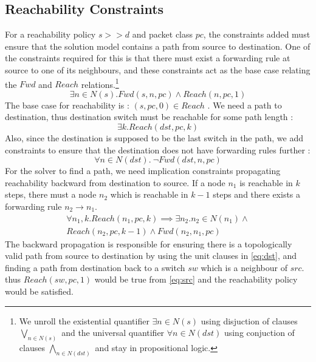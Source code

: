 \subsection{Reachability Constraints} \label{sec:reach}
For a reachability policy $s >> d$ and packet class $pc$, the constraints added must ensure that the solution model contains a path 
from source to destination. 
One of the constraints required for this is that there must exist a forwarding rule at source to one of its neighbours, and 
these constraints
act as the base case relating the $Fwd$ and $Reach$ relations.\footnote{
	We unroll the existential quantifier $\exists n \in N(s)$ using disjuction of 
	clauses $\bigvee\limits_{n \in N(s)}$ and
	the universal quantifier $\forall n \in N(dst)$ using conjuction of clauses $\bigwedge\limits_{n \in N(dst)}$
	and stay in propositional logic.} 
\begin{equation} \label{eq:src}
	\exists n \in N(s). Fwd(s, n, pc) \wedge Reach(n, pc, 1)
\end{equation}
The base case for reachability is : $(s, pc,0) \in Reach$ . We need a path to destination, thus destination switch must be reachable for some path length : 
\begin{equation} \label{eq:dst}
	\exists k. Reach(dst, pc, k)
\end{equation}
Also, since the destination is supposed to be the last switch in the path, we add constraints
to ensure that the destination does not have forwarding rules further : 
\begin{equation}
	\forall n \in N(dst). \ \neg Fwd(dst, n, pc)
\end{equation}
For the solver to find a path, we need implication constraints propagating reachability backward from destination to source. 
If a node $n_1$ is reachable in $k$ steps, there must a node $n_2$ which is reachable in  $k-1$ steps and there exists a forwarding rule $n_2 \rightarrow n_1$.
\begin{multline} \label{eq:bckprop}
\forall n_1,k.  Reach(n_1,pc,k) \implies \exists n_2.  n_2 \in N(n_1) \wedge \\ Reach(n_2,pc,k-1) \wedge Fwd(n_2,n_1,pc)
\end{multline} 
The backward propagation is responsible for ensuring there is a topologically valid path from source to destination by using the unit clauses in \cref{eq:dst}, and finding a path from destination back to a switch $sw$ which is a neighbour of $src$. thus $Reach(sw,pc,1)$ would be true from \cref{eq:src} and the reachability policy would be satisfied. 

